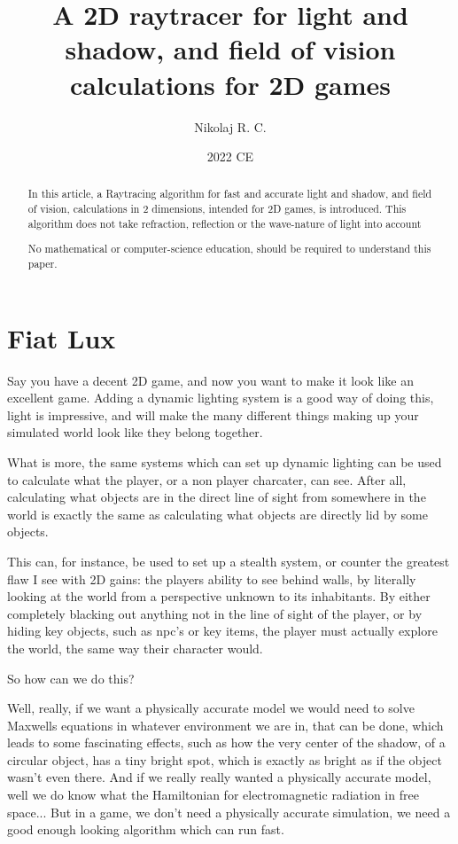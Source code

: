 \documentclass[a4paper,12pt,article]{memoir}
\title{A 2D raytracer for light and shadow, and field of vision calculations for 2D games}
\author{Nikolaj R. C.}
\date{2022 CE} %
\begin{document}
\maketitle

\begin{abstract}

In this article, a Raytracing algorithm for fast and accurate light and shadow, and field of vision, calculations in 2 dimensions, intended for 2D games, is introduced. This algorithm does not take refraction, reflection or the wave-nature of light into account

No mathematical or computer-science education, should be required to understand this paper.

\end{abstract}


\chapter{Fiat Lux}
Say you have a decent 2D game, and now you want to make it look like an excellent game. Adding a dynamic lighting system is a good way of doing this, light is impressive, and will make the many different things making up your simulated world look like they belong together.

What is more, the same systems which can set up dynamic lighting can be used to calculate what the player, or a non player charcater, can see. After all, calculating what objects are in the direct line of sight from somewhere in the world is exactly the same as calculating what objects are directly lid by some objects.

This can, for instance, be used to set up a stealth system, or counter the greatest flaw I see with 2D gains: the players ability to see behind walls, by literally looking at the world from a perspective unknown to its inhabitants. By either completely blacking out anything not in the line of sight of the player, or by hiding key objects, such as npc's or key items, the player must actually explore the world, the same way their character would.

So how can we do this?

Well, really, if we want a physically accurate model we would need to solve Maxwells equations in whatever environment we are in, that can be done, which leads to some fascinating effects, such as how the very center of the shadow, of a circular object, has a tiny bright spot, which is exactly as bright as if the object wasn't even there. And if we really really wanted a physically accurate model, well we do know what the Hamiltonian for electromagnetic radiation in free space... But in a game, we don't need a physically accurate simulation, we need a good enough looking algorithm which can run fast.
\end{document}
